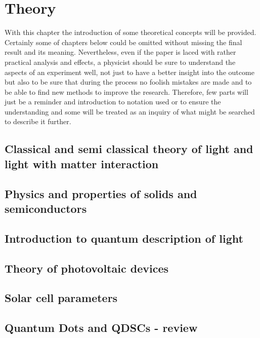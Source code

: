\chapter{Theory}

With this chapter the introduction of some theoretical concepts will be provided. Certainly some of chapters below could be omitted without missing the final result and its meaning. Nevertheless, even if the paper is laced with rather practical analysis and effects, a physicist should be sure to understand the aspects of an experiment well, not just to have a better insight into the outcome but also to be sure that during the process no foolish mistakes are made and to be able to find new methods to improve the research. Therefore, few parts will just be a reminder and introduction to notation used or to ensure the understanding and some will be treated as an inquiry of what might be searched to describe it further. 
\section{Classical and semi classical theory of light and light with matter interaction}

\section{Physics and properties of solids and semiconductors}

\section{Introduction to quantum description of light}

\section{Theory of photovoltaic devices}

\section{Solar cell parameters}

\section{Quantum Dots and QDSCs - review}
